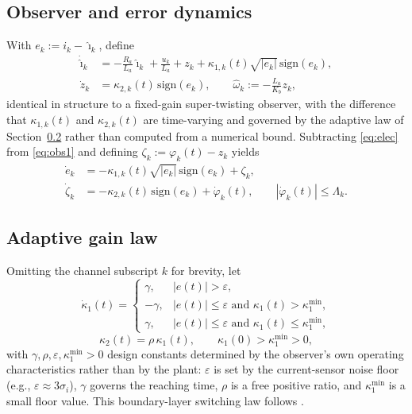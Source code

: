 \documentclass[letterpaper, 10 pt, conference]{ieeeconf}
\begin{document}
\subsection{Observer and error dynamics}
With $e_k:=i_k-\hat\imath_k$, define
\begin{align}
\dot{\hat\imath}_k &= -\frac{R_a}{L_a}\hat\imath_k+\frac{u_k}{L_a}+z_k+\kappa_{1,k}(t)\sqrt{|e_k|}\,\mathrm{sign}(e_k), \label{eq:obs1}\\
\dot z_k &= \kappa_{2,k}(t)\,\mathrm{sign}(e_k), \qquad \hat\omega_k := -\frac{L_a}{K_b} z_k, \label{eq:obs2}
\end{align}
identical in structure to a fixed-gain super-twisting observer, with the difference that $\kappa_{1,k}(t)$ and $\kappa_{2,k}(t)$ are time-varying and governed by the adaptive law of Section~\ref{sec:adaptlaw} rather than computed from a numerical bound. Subtracting \eqref{eq:elec} from \eqref{eq:obs1} and defining $\zeta_k:=\varphi_k(t)-z_k$ yields
\begin{align}
\dot e_k &= -\kappa_{1,k}(t)\sqrt{|e_k|}\,\mathrm{sign}(e_k)+\zeta_k, \label{eq:err1}\\
\dot\zeta_k &= -\kappa_{2,k}(t)\,\mathrm{sign}(e_k)+\dot\varphi_k(t), \qquad |\dot\varphi_k(t)|\le\Lambda_k. \label{eq:err2}
\end{align}

\subsection{Adaptive gain law}
\label{sec:adaptlaw}
Omitting the channel subscript $k$ for brevity, let
\begin{equation}
\dot\kappa_1(t)=
\begin{cases}
\gamma, & |e(t)|>\varepsilon,\\
-\gamma, & |e(t)|\le\varepsilon \text{ and } \kappa_1(t)>\kappa_1^{\min},\\
\gamma, & |e(t)|\le\varepsilon \text{ and } \kappa_1(t)\le\kappa_1^{\min},
\end{cases}
\label{eq:adaptlaw}
\end{equation}
\begin{equation}
\kappa_2(t)=\rho\,\kappa_1(t), \qquad \kappa_1(0)>\kappa_1^{\min}>0,
\label{eq:ratio}
\end{equation}
with $\gamma,\rho,\varepsilon,\kappa_1^{\min}>0$ design constants determined by the observer's own operating characteristics rather than by the plant: $\varepsilon$ is set by the current-sensor noise floor (e.g., $\varepsilon\approx3\sigma_i$), $\gamma$ governs the reaching time, $\rho$ is a free positive ratio, and $\kappa_1^{\min}$ is a small floor value. This boundary-layer switching law follows \cite{Plestan2010,Shtessel2012}.
\end{document}

